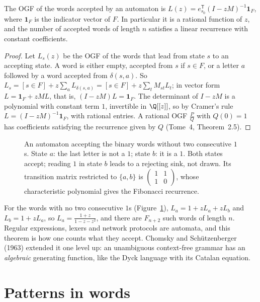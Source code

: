 \begin{theorem}\label{thm:automaton}
The OGF of the words accepted by an automaton is $L(z)=e_{s_0}^{\mathsf T}(I-zM)^{-1}\mathbf 1_F$, where $\mathbf 1_F$ is the indicator vector of $F$. In particular it is a
rational function of $z$, and the number of accepted words of length $n$ satisfies a linear recurrence with constant coefficients.
\end{theorem}
\begin{proof}
Let $L_s(z)$ be the OGF of the words that lead from state $s$ to an accepting state. A word is either empty, accepted from $s$ if $s\in F$, or
a letter $a$ followed by a word accepted from $\delta(s,a)$. So $L_s=[s\in F]+z\sum_aL_{\delta(s,a)}=[s\in F]+z\sum_tM_{st}L_t$; in vector form $L=\mathbf 1_F+zML$, that
is, $(I-zM)L=\mathbf 1_F$. The determinant of $I-zM$ is a polynomial with constant term $1$, invertible in $\Q[[z]]$, so by Cramer's rule
$L=(I-zM)^{-1}\mathbf 1_F$, with rational entries. A rational OGF $\frac PQ$ with $Q(0)=1$ has coefficients satisfying the recurrence given by $Q$
(Tome~4, Theorem~2.5).
\end{proof}

\begin{figure}[ht]
\centering
{}
\caption{An automaton accepting the binary words without two consecutive $1$s. State $a$: the last letter is not a $1$;
state $b$: it is a $1$. Both states accept; reading $1$ in state $b$ leads to a rejecting sink, not drawn. Its transition
matrix restricted to $\{a,b\}$ is $\left(\begin{smallmatrix}1&1\\1&0\end{smallmatrix}\right)$, whose characteristic polynomial gives the Fibonacci recurrence.}
\label{fig:automaton}
\end{figure}

For the words with no two consecutive $1$s (Figure~\ref{fig:automaton}), $L_a=1+zL_a+zL_b$ and $L_b=1+zL_a$, so $L_a=\frac{1+z}{1-z-z^2}$, and there
are $F_{n+2}$ such words of length $n$. Regular expressions, lexers and network protocols are automata, and this theorem is how one
counts what they accept. Chomsky and Sch\"utzenberger (1963) extended it one level up: an unambiguous context-free grammar has an
\emph{algebraic} generating function, like the Dyck language with its Catalan equation.

\section{Patterns in words}

